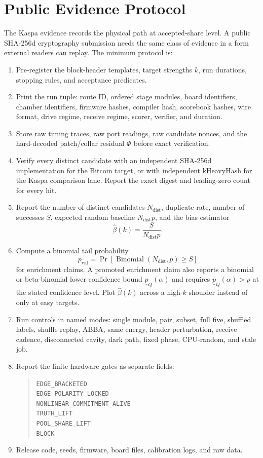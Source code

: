 \documentclass[11pt]{article}
\theoremstyle{definition}
\theoremstyle{remark}
\begin{document}
\section{Public Evidence Protocol}

The Kaspa evidence records the physical path at accepted-share level. A public
SHA-256d cryptography submission needs the same class of evidence in a form
external readers can replay. The minimum protocol is:

\begin{enumerate}
\item Pre-register the block-header templates, target strengths \(k\), run
durations, stopping rules, and acceptance predicates.
\item Print the run tuple: route ID, ordered stage modules, board identifiers,
chamber identifiers, firmware hashes, compiler hash, scorebook hashes, wire
format, drive regime, receive regime, scorer, verifier, and duration.
\item Store raw timing traces, raw port readings, raw candidate nonces, and the
hard-decoded patch/collar residual \(\Phi\) before exact verification.
\item Verify every distinct candidate with an independent SHA-256d
implementation for the Bitcoin target, or with independent kHeavyHash for the
Kaspa comparison lane. Report the exact digest and leading-zero count for every
hit.
\item Report the number of distinct candidates \(N_{\mathrm{dist}}\), duplicate
rate, number of successes \(S\), expected random baseline
\(N_{\mathrm{dist}}p\), and the bias estimator
\[
\widehat\beta(k)=\frac{S}{N_{\mathrm{dist}}p}.
\]
\item Compute a binomial tail probability
\[
p_{\mathrm{val}}=\Pr\left[\operatorname{Binomial}(N_{\mathrm{dist}},p)\ge S\right]
\]
for enrichment claims. A promoted enrichment claim also reports a binomial or beta-binomial lower
confidence bound \(\underline p_Q(\alpha)\) and requires
\(\underline p_Q(\alpha)>p\) at the stated confidence level. Plot \(\widehat\beta(k)\) across a
high-\(k\) shoulder instead of only at easy targets.
\item Run controls in named modes: single module, pair, subset, full five,
shuffled labels, shuffle replay, ABBA, same energy, header perturbation,
receive cadence, disconnected cavity, dark path, fixed phase, CPU-random, and
stale job.
\item Report the finite hardware gates as separate fields:
\begin{quote}\small
\texttt{EDGE\_BRACKETED}\\
\texttt{EDGE\_POLARITY\_LOCKED}\\
\texttt{NONLINEAR\_COMMITMENT\_ALIVE}\\
\texttt{TRUTH\_LIFT}\\
\texttt{POOL\_SHARE\_LIFT}\\
\texttt{BLOCK}
\end{quote}
\item Release code, seeds, firmware, board files, calibration logs, and raw
data.
\end{enumerate}
\end{document}
